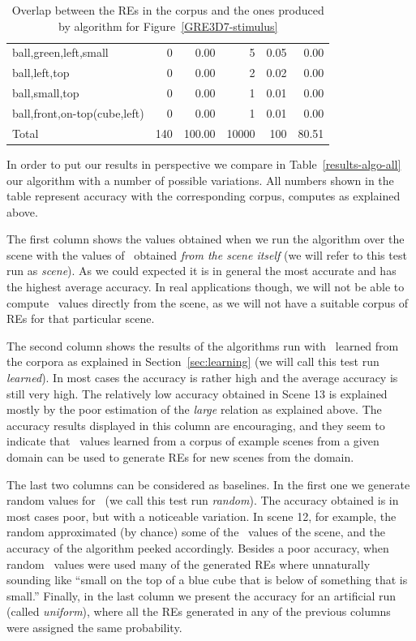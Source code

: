 \begin{table}[t]
\begin{small}
\begin{center}
\begin{tabular}{|l|r|r|r|r|r|}
ball,green,left,small                         &  0 &  0.00 &    5 &  0.05 &  0.00\\
ball,left,top                                 &  0 &  0.00 &    2 &  0.02 &  0.00\\
ball,small,top                                &  0 &  0.00 &    1 &  0.01 &  0.00\\
ball,front,on-top(cube,left)                  &  0 &  0.00 &    1 &  0.01 &  0.00\\
\hline
Total & 140 & 100.00 & 10000 & 100 & 80.51 \\
\hline
\end{tabular}
\caption{Overlap between the REs in the corpus and the ones produced by algorithm for Figure~\ref{GRE3D7-stimulus}\label{results-algo-fig3}}
\end{center}
\end{small}
\end{table}

In order to put our results in perspective we compare in Table~\ref{results-algo-all} 
our algorithm with a number of possible variations.  All numbers shown in the table 
represent accuracy with the corresponding corpus, computes as explained above. 
 
The first column shows the values obtained when we run the algorithm over the scene
with the values of \puse\ obtained \emph{from the scene itself} (we will refer to this
test run as \emph{scene}).  As we could expected
it is in general the most accurate and has the highest average accuracy. In real 
applications though, we will not be able to compute \puse\ values directly from the 
scene, as we will not have a suitable corpus of REs for that particular scene. 

The second column shows the results of the algorithms run with \puse\ learned from the 
corpora as explained in Section~\ref{sec:learning} (we will call this test run \emph{learned}).  In most cases the accuracy 
is rather high and the average accuracy is still very high. The relatively low accuracy 
obtained in Scene 13 is explained mostly by the poor estimation of the \emph{large} 
relation as explained above.  The accuracy results displayed in this column are 
encouraging, and they seem to indicate that \puse\ values learned from a corpus of example 
scenes from a given domain can be used to generate REs for new scenes from the domain. 

The last two columns can be considered as baselines. In the first one we generate 
random values for \puse\ (we call this test run \emph{random}).  The accuracy obtained is in most cases poor, but with 
a noticeable variation. In scene 12, for example, the random \puse approximated 
(by chance) some of the \puse\ values of the scene, and the accuracy of the algorithm 
peeked accordingly. Besides a poor accuracy, when random \puse\ values were used many of the generated REs where unnaturally sounding like ``small 
on the top of a blue cube that is below of something that is small.'' Finally, 
in the last column we present the accuracy for an artificial run (called \emph{uniform}), where all the 
REs generated in any of the previous columns were assigned the same 
probability. 

